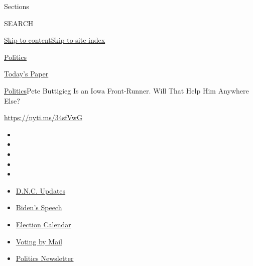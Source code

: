 Sections

SEARCH

\protect\hyperlink{site-content}{Skip to
content}\protect\hyperlink{site-index}{Skip to site index}

\href{https://www.nytimes3xbfgragh.onion/section/politics}{Politics}

\href{https://myaccount.nytimes3xbfgragh.onion/auth/login?response_type=cookie\&client_id=vi}{}

\href{https://www.nytimes3xbfgragh.onion/section/todayspaper}{Today's
Paper}

\href{/section/politics}{Politics}\textbar{}Pete Buttigieg Is an Iowa
Front-Runner. Will That Help Him Anywhere Else?

\url{https://nyti.ms/34sfVwG}

\begin{itemize}
\item
\item
\item
\item
\item
\end{itemize}

\begin{itemize}
\item
  \href{https://www.nytimes3xbfgragh.onion/live/2020/08/20/us/dnc-convention-election?action=click\&pgtype=Article\&state=default\&region=TOP_BANNER\&context=storylines_menu}{D.N.C.
  Updates}
\item
  \href{https://www.nytimes3xbfgragh.onion/2020/08/20/us/politics/biden-presidential-nomination-dnc.html?action=click\&pgtype=Article\&state=default\&region=TOP_BANNER\&context=storylines_menu}{Biden's
  Speech}
\item
  \href{https://www.nytimes3xbfgragh.onion/interactive/2019/us/elections/2020-presidential-election-calendar.html?action=click\&pgtype=Article\&state=default\&region=TOP_BANNER\&context=storylines_menu}{Election
  Calendar}
\item
  \href{https://www.nytimes3xbfgragh.onion/interactive/2020/08/11/us/politics/vote-by-mail-us-states.html?action=click\&pgtype=Article\&state=default\&region=TOP_BANNER\&context=storylines_menu}{Voting
  by Mail}
\item
  \href{https://www.nytimes3xbfgragh.onion/newsletters/politics?action=click\&pgtype=Article\&state=default\&region=TOP_BANNER\&context=storylines_menu}{Politics
  Newsletter}
\end{itemize}

